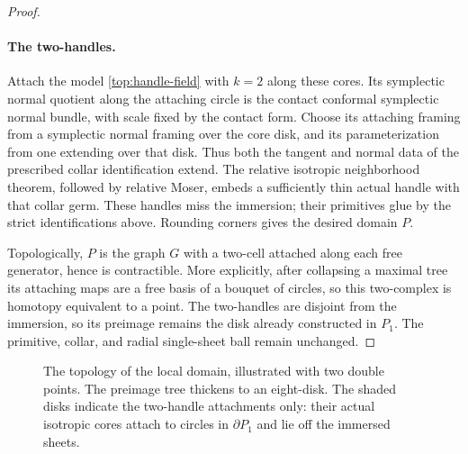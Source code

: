 \documentclass[11pt]{article}
\theoremstyle{definition}
\theoremstyle{remark}
\numberwithin{equation}{section}
\begin{document}
\begin{proof}
\paragraph{The two-handles.}
Attach the model \eqref{top:handle-field} with $k=2$ along these
cores.  Its symplectic normal quotient along the attaching
circle is the contact conformal symplectic normal bundle,
with scale fixed by the contact form.  Choose its attaching
framing from a symplectic normal framing over the core disk,
and its parameterization from one extending over that disk.
Thus both the tangent and normal data of the prescribed collar
identification extend.  The relative isotropic neighborhood
theorem, followed by relative Moser, embeds a sufficiently thin
actual handle with that collar germ.  These handles miss the
immersion; their primitives glue by the strict identifications
above.  Rounding corners gives the desired domain $P$.

Topologically, $P$ is the graph $G$ with a two-cell attached
along each free generator, hence is contractible.  More
explicitly, after collapsing a maximal tree its attaching maps
are a free basis of a bouquet of circles, so this two-complex
is homotopy equivalent to a point.  The two-handles are
disjoint from the immersion, so its preimage remains the disk
already constructed in $P_1$.  The primitive, collar, and
radial single-sheet ball remain unchanged.
\end{proof}

\begin{figure}[tb]
\centering
{}
\caption{The topology of the local domain, illustrated with two double
points.  The preimage tree thickens to an eight-disk.  The shaded disks
indicate the two-handle attachments only: their actual isotropic cores
attach to circles in $\partial P_1$ and lie off the immersed sheets.}
\label{top:domain-figure}
\end{figure}
\end{document}
